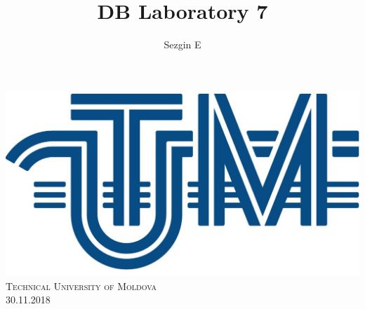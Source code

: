 \documentclass[12pt]{article}
\title{DB Laboratory 7}
\author{Sezgin E}
\begin{document}
        
        
        \begin{titlepage}
                \centering
                \vspace*{0.5 cm}
                \includegraphics[scale = 0.11]{LOGO_UTM.jpg}\\[1.0 cm]	%
                \textsc{\LARGE Technical University of Moldova}\\[2.0 cm]%
                \textsc{\Large 30.11.2018}\\[0.5 cm]		%


\end{titlepage}
\end{document}
